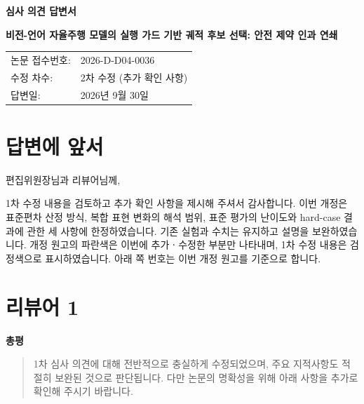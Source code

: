 \documentclass[11pt]{article}
\newcommand{\manuscripttitle}{비전-언어 자율주행 모델의 실행 가드 기반 궤적 후보 선택: 안전 제약 인과 연쇄}
\newcommand{\manuscriptid}{2026-D-D04-0036}
\newcommand{\revisionround}{2차 수정 (추가 확인 사항)}
\newcommand{\responsedate}{2026년 9월 30일}
\begin{document}
\begin{center}
  {\LARGE\bfseries 심사 의견 답변서\par}
  \vspace{1em}
  {\large\bfseries \manuscripttitle\par}
\end{center}
\vspace{0.8em}
\begin{tabular}{@{}ll@{}}
논문 접수번호: & \manuscriptid \\
수정 차수: & \revisionround \\
답변일: & \responsedate
\end{tabular}

\section*{답변에 앞서}
편집위원장님과 리뷰어님께,

1차 수정 내용을 검토하고 추가 확인 사항을 제시해 주셔서 감사합니다.
이번 개정은 표준편차 산정 방식, 복합 표현 변화의 해석 범위,
표준 평가의 난이도와 hard-case 결과에 관한 세 사항에 한정하였습니다.
기존 실험과 수치는 유지하고 설명을 보완하였습니다.
개정 원고의 파란색은 이번에 추가ㆍ수정한 부분만 나타내며,
1차 수정 내용은 검정색으로 표시하였습니다.
아래 쪽 번호는 이번 개정 원고를 기준으로 합니다.

\section*{리뷰어 1}
\textbf{총평}\par
\begin{quote}
1차 심사 의견에 대해 전반적으로 충실하게 수정되었으며, 주요 지적사항도 적절히 보완된 것으로 판단됩니다. 다만 논문의 명확성을 위해 아래 사항을 추가로 확인해 주시기 바랍니다.
\end{quote}
\end{document}
